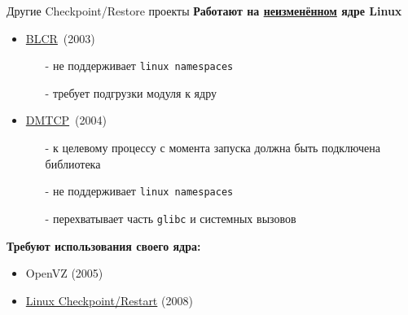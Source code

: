 \begin{frame}{Другие Checkpoint/Restore проекты}
\textbf{Работают на \underline{неизменённом} ядре Linux}
\begin{itemize}
	\item \href{http://crd.lbl.gov/departments/computer-science/CLaSS/research/BLCR/}{BLCR}\footnotemark \ (2003)
		\begin{itemize}
				\item[-] не поддерживает \texttt{linux namespaces}
				\item[-] требует подгрузки модуля к ядру
		\end{itemize}
	\item \href{http://dmtcp.sourceforge.net/}{DMTCP}\footnotemark\ (2004)
		\begin{itemize}
			\item[-] к целевому процессу с момента запуска должна быть подключена библиотека
			\item[-] не поддерживает \texttt{linux namespaces}
			\item[-] перехватывает часть \texttt{glibc} и системных вызовов
		\end{itemize}
\end{itemize}
\textbf{Требуют использования своего ядра:}
\begin{itemize}
	\item OpenVZ (2005)
	\item \href{https://ckpt.wiki.kernel.org/index.php/Main_Page}{Linux Checkpoint/Restart} (2008)
\end{itemize}
\end{frame}


